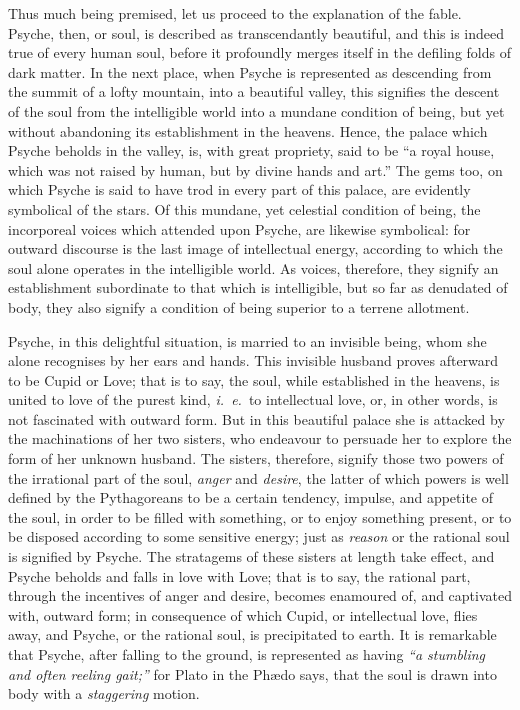 \documentclass{article}
\begin{document}
{Thus much being premised, let us proceed to the explanation of the fable.
Psyche, then, or soul, is described as transcendantly beautiful, and this is
indeed true of every human soul, before it profoundly merges itself in the
defiling folds of dark matter. In the next place, when Psyche is represented as
descending from the summit of a lofty mountain, into a beautiful valley, this
signifies the descent of the soul from the intelligible world into a mundane
condition of being, but yet without abandoning its establishment in the
heavens. Hence, the palace which Psyche beholds in the valley, is, with great
propriety, said to be ``a royal house, which was not raised by human, but by
divine hands and art.'' The gems too, on which Psyche is said to have trod in
every part of this palace, are evidently symbolical of the stars. Of this
mundane, yet celestial condition of being, the incorporeal voices which
attended upon Psyche, are likewise symbolical: for outward discourse is the
last image of intellectual energy, according to which the soul alone operates
in the intelligible world. As voices, therefore, they signify an establishment
subordinate to that which is intelligible, but so far as denudated of body,
they also signify a condition of being superior to a terrene allotment.

Psyche, in this delightful situation, is married to an invisible being, whom
she alone recognises by her ears and hands. This invisible husband proves
afterward to be Cupid or Love; that is to say, the soul, while established in
the heavens, is united to love of the purest kind, \textit{i.~e.}~to
intellectual love, or, in other words, is not fascinated with outward form. But
in this beautiful palace she is attacked by the machinations of her two
sisters, who endeavour to persuade her to explore the form of her unknown
husband. The sisters, therefore, signify those two powers of the irrational
part of the soul, \textit{anger} and \textit{desire}, the latter of which
powers is well defined by the Pythagoreans to be a certain tendency, impulse,
and appetite of the soul, in order to be filled with something, or to enjoy
something present, or to be disposed according to some sensitive energy; just
as \textit{reason} or the rational soul is signified by Psyche. The stratagems
of these sisters at length take effect, and Psyche beholds and falls in love
with Love; that is to say, the rational part, through the incentives of anger
and desire, becomes enamoured of, and captivated with, outward form; in
consequence of which Cupid, or intellectual love, flies away, and Psyche, or
the rational soul, is precipitated to earth. It is remarkable that Psyche,
after falling to the ground, is represented as having \textit{``a stumbling and
often reeling gait;''} for Plato in the Ph{\ae}do says, that the soul is drawn
into body with a \textit{staggering} motion.

}
\end{document}

